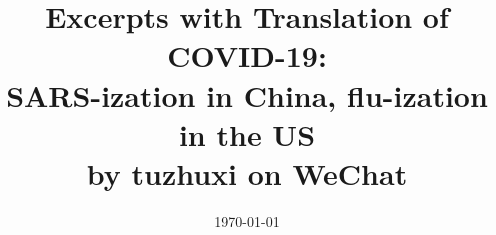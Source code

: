 \documentclass[onecolumn,journal]{IEEEtran}
\begin{document}
\title{\color{Brown} Excerpts with Translation of \\COVID-19:\\ SARS-ization in China, flu-ization in the US \\ by tuzhuxi on WeChat
\vspace{-0.35ex}}
\author{
 \today 
  \vspace{-8ex} \\ 
\textbf{}
 }
    
\maketitle




\thispagestyle{empty} %





\end{document}
